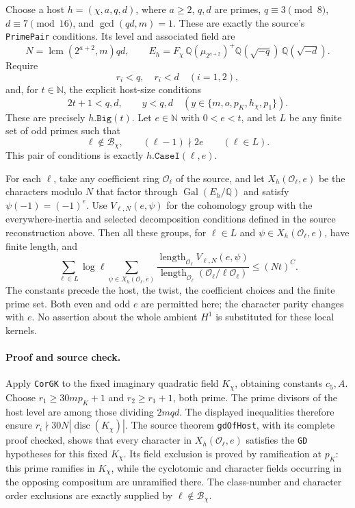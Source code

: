 \documentclass[11pt,a4paper]{article}
\theoremstyle{definition}
\begin{document}
Choose a host \(h=(\chi,a,q,d)\), where \(a\ge2\), \(q,d\) are primes,
\(q\equiv3\pmod8\), \(d\equiv7\pmod{16}\), and
\(\gcd(qd,m)=1\).  These are exactly the source's
\texttt{PrimePair} conditions.  Its level and associated field are
\[
 N=\operatorname{lcm}(2^{a+2},m)qd,
 \qquad
 E_h=F_\chi\,\mathbb Q(\mu_{2^{a+2}})^+
          \mathbb Q(\sqrt{-q})\,\mathbb Q(\sqrt{-d}).
\]
Require
\[
 r_i<q,\quad r_i<d\quad(i=1,2),
\]
and, for \(t\in\mathbb N\), the explicit host-size conditions
\[
 2t+1<q,d,
 \qquad y<q,d\quad
 (y\in\{m,o,p_K,h_\chi,p_1\}).
\]
These are precisely \(h.\texttt{Big}(t)\).  Let \(e\in\mathbb N\) with \(0<e<t\), and let
\(L\) be any finite set of odd primes such that
\[
 \ell\notin\mathcal B_\chi,
 \qquad (\ell-1)\nmid 2e
 \qquad(\ell\in L).
\]
This pair of conditions is exactly \(h.\texttt{CaseI}(\ell,e)\).

For each \(\ell\), take any coefficient ring \(\mathcal O_\ell\) of the
source, and let \(X_h(\mathcal O_\ell,e)\) be the characters modulo
\(N\) that factor through \(\operatorname{Gal}(E_h/\mathbb Q)\) and
satisfy \(\psi(-1)=(-1)^e\).  Use \(V_{\ell,N}(e,\psi)\) for the
cohomology group with the everywhere-inertia and selected decomposition
conditions defined in the source reconstruction above.  Then all these
groups, for \(\ell\in L\) and \(\psi\in X_h(\mathcal O_\ell,e)\),
have finite length, and
\begin{equation}\label{eq:host-case-one-bound}
 \sum_{\ell\in L}\log\ell\!
 \sum_{\psi\in X_h(\mathcal O_\ell,e)}
 \frac{\operatorname{length}_{\mathcal O_\ell}
                   V_{\ell,N}(e,\psi)}
      {\operatorname{length}_{\mathcal O_\ell}
                   (\mathcal O_\ell/\ell\mathcal O_\ell)}
 \le (Nt)^C.
\end{equation}
The constants precede the host, the twist, the coefficient choices and
the finite prime set.  Both even and odd \(e\) are permitted here;
the character parity changes with \(e\).  No assertion about the whole
ambient \(H^1\) is substituted for these local kernels.

\paragraph{Proof and source check.}
Apply \texttt{CorGK} to the fixed imaginary quadratic field
\(K_\chi\), obtaining constants \(c_5,A\).  Choose
\(r_1\ge30mp_K+1\) and \(r_2\ge r_1+1\), both prime.
The prime divisors of the host level are among those dividing \(2mqd\).
The displayed inequalities therefore ensure
\(r_i\nmid30N|\operatorname{disc}(K_\chi)|\).
The source theorem \texttt{gdOfHost}, with its complete proof checked,
shows that every character in \(X_h(\mathcal O_\ell,e)\) satisfies the
\texttt{GD} hypotheses for this fixed \(K_\chi\).  Its field exclusion
is proved by ramification at \(p_K\): this prime ramifies in
\(K_\chi\), while the cyclotomic and character fields occurring in the
opposing compositum are unramified there.  The class-number and character
order exclusions are exactly supplied by \(\ell\notin\mathcal B_\chi\).
\end{document}
